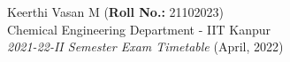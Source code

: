 \documentclass[10pt]{article}
\begin{document}
\pagestyle{empty} 
\setlength{\parindent}{0pt}
\begin{center}
    
    Keerthi Vasan M (\textbf{Roll No.:} 21102023)\\
    Chemical Engineering Department - IIT Kanpur\\
    \textit{2021-22-II Semester Exam Timetable} \color[HTML]{FE0000} (April, 2022)
    
\end{center}


\begin{calendar}{\textwidth} %





\BlankDay
\BlankDay
\BlankDay
\BlankDay
\BlankDay



\end{calendar}
\end{document}
